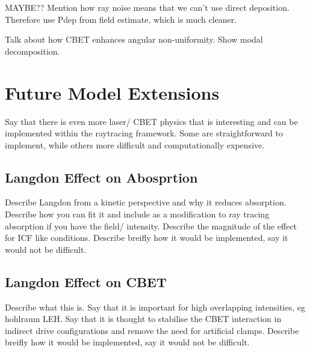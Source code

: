 MAYBE??
Mention how ray noise means that we can't use direct deposition.
Therefore use Pdep from field estimate, which is much cleaner.

Talk about how CBET enhances angular non-uniformity.
Show modal decomposition.


\section{Future Model Extensions}

Say that there is even more laser/ CBET physics that is interesting and can be implemented within the raytracing framework.
Some are straightforward to implement, while others more difficult and computationally expensive.

\subsection{Langdon Effect on Abosprtion}

Describe Langdon from a kinetic perspective and why it reduces absorption.
Describe how you can fit it and include as a modification to ray tracing absorption if you have the field/ intensity.
Describe the magnitude of the effect for ICF like conditions.
Describe breifly how it would be implemented, say it would not be difficult.

\subsection{Langdon Effect on CBET}

Describe what this is.
Say that it is important for high overlapping intensities, eg hohlraum LEH.
Say that it is thought to stabilise the CBET interaction in indirect drive configurations and remove the need for artificial clamps.
Describe breifly how it would be implemented, say it would not be difficult.

